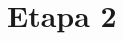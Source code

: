 \documentclass[aspectratio=169,10pt]{beamer}
\newcommand{\phiND}{\ensuremath{\phi_{\mathrm{ND}}}}
\newcommand{\Vp}{\ensuremath{V_{\mathrm{p}}}}
\newcommand{\Vs}{\ensuremath{V_{\mathrm{s}}}}
\begin{document}

\section{Etapa 2}
\end{document}
